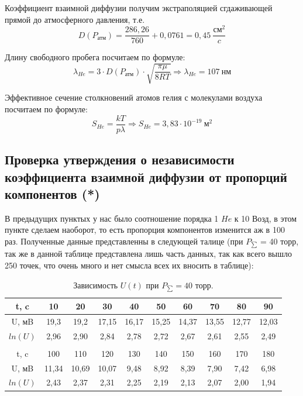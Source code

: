 \documentclass[a4paper,12pt]{article}
\begin{document}
Коэффициент взаимной диффузии получим экстраполяцией сгдаживающей прямой до атмосферного давления, т.е.
\begin{equation}
	D(P_{\text{атм}}) = \frac{286,26}{760} + 0,0761 = 0,45\ \frac{\text{см}^2}{c}
\end{equation}

Длину свободного пробега посчитаем по формуле:
\begin{equation}
	\lambda_{He} = 3\cdot D(P_{\text{атм}})\cdot \sqrt{\dfrac{\pi \mu}{8RT}} \Rightarrow  \lambda_{He} = 107\ \text{нм}
\end{equation}

Эффективное сечение столкновений атомов гелия с молекулами воздуха посчитаем по формуле:
\begin{equation}
	S_{He} = \frac{kT}{p\lambda} \Rightarrow S_{He} = 3,83 \cdot 10^{-19}\ \text{м}^2
\end{equation}


\subsection{Проверка утверждения о независимости коэффициента взаимной диффузии от пропорций компонентов (*)}

В предыдущих пунктых у нас было соотношение порядка 1 $He$ к 10 Возд, в этом пункте сделаем наоборот, то есть пропорция компонентов изменится аж в 100 раз. Полученные данные представленны в следующей талице (при $P_{\sum}$ = 40 торр, так же в данной таблице представлена лишь часть данных, так как всего вышло 250 точек, что очень много и нет смысла всех их вносить в таблице):

\begin{table}[!h]
	\caption{Зависимость $U(t)$ при $P_{\sum} = 40 $ торр.}
\begin{tabular}{| c | c | c | c | c | c | c | c | c | c |}
\hline
t, c & 10 & 20 & 30 & 40 & 50 & 60 & 70 & 80 & 90  \\ \hline
U, мB & 19,3 & 19,2 & 17,15 & 16,17 & 15,25 & 14,37 & 13,55 & 12,77 & 12,03  \\ \hline
$ln(U)$ & 2,96 & 2,90 & 2,84 & 2,78 & 2,72 & 2,67 & 2,61 & 2,55 & 2,49  \\ \hline
\\  \hline
t, c & 100 & 110 & 120 & 130 & 140 & 150 & 160 & 170 & 180    \\ \hline
U, мB & 11,34 & 10,69 & 10,07 & 9,48 & 8,92 & 8,39 & 7,90 & 7,42 & 6,98  \\ \hline
$ln(U)$ & 2,43 & 2,37 & 2,31 & 2,25 & 2,19 & 2,13 & 2,07 & 2,00 & 1,94 \\ \hline
\end{tabular}\\
\end{table}
\end{document}
